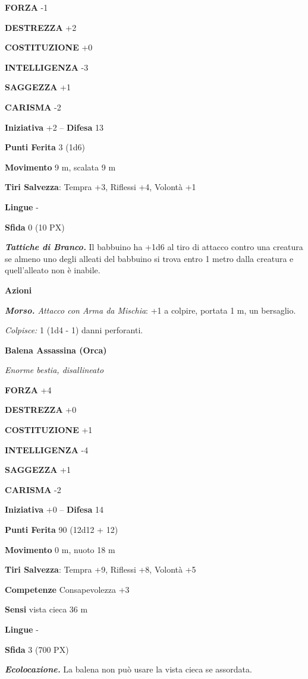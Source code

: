 \begin{multicols}{2}
\textbf{FORZA} -1

\textbf{DESTREZZA} +2

\textbf{COSTITUZIONE} +0

\textbf{INTELLIGENZA} -3

\textbf{SAGGEZZA} +1

\textbf{CARISMA} -2

\textbf{Iniziativa} +2 -- \textbf{Difesa} 13

\textbf{Punti Ferita} 3 (1d6)

\textbf{Movimento} 9 m, scalata 9 m

\textbf{Tiri Salvezza}: Tempra +3, Riflessi +4, Volontà +1

\textbf{Lingue} -

\textbf{Sfida} 0 (10 PX)

\textit{\textbf{Tattiche di Branco.}} Il babbuino ha +1d6 al tiro di attacco contro una creatura se almeno uno degli alleati del babbuino si trova entro 1 metro dalla creatura e quell'alleato non è inabile.

\textbf{Azioni}

\textit{\textbf{Morso.} Attacco con Arma da Mischia}: +1 a colpire, portata 1 m, un bersaglio.

\textit{Colpisce:} 1 (1d4 - 1) danni perforanti.


\medskip\textbf{Balena Assassina (Orca)}

\textit{Enorme bestia, disallineato}

\textbf{FORZA} +4

\textbf{DESTREZZA} +0

\textbf{COSTITUZIONE} +1

\textbf{INTELLIGENZA} -4

\textbf{SAGGEZZA} +1

\textbf{CARISMA} -2

\textbf{Iniziativa} +0 -- \textbf{Difesa} 14

\textbf{Punti Ferita} 90 (12d12 + 12)

\textbf{Movimento} 0 m, nuoto 18 m

\textbf{Tiri Salvezza}: Tempra +9, Riflessi +8, Volontà +5

\textbf{Competenze} Consapevolezza +3

\textbf{Sensi} vista cieca 36 m

\textbf{Lingue} -

\textbf{Sfida} 3 (700 PX)

\textit{\textbf{Ecolocazione.}} La balena non può usare la vista cieca se assordata.


\end{multicols}
